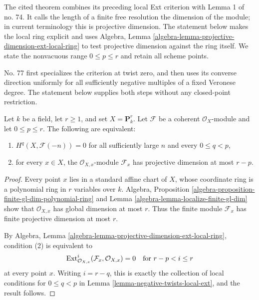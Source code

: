 \begin{lemma}
\label{lemma-negative-twists-projective-dimension}
\begin{reference}
\cite[Chapter III, \S 5, no. 74, Theorem 2,
p. 269]{FAC}
\cite[Chapter III, \S 5, no. 77, local corollary and
proof of Proposition 4(c), pp. 272--273]{FAC}
\end{reference}
\begin{history}
The cited theorem combines its preceding local Ext criterion with
Lemma 1 of no. 74. It calls the length of a finite free resolution the
dimension of the module; in current terminology this is projective
dimension. The statement below makes the local ring explicit and uses
Algebra, Lemma \ref{algebra-lemma-projective-dimension-ext-local-ring}
to test projective dimension against the ring itself. We state the
nonvacuous range $0\leq p\leq r$ and retain all scheme points.

No. 77 first specializes the criterion at twist zero, and then uses its
converse direction uniformly for all sufficiently negative multiples of a
fixed Veronese degree. The statement below supplies both steps without any
closed-point restriction.
\end{history}
Let $k$ be a field, let $r\geq1$, and set
$X=\mathbf{P}^r_k$. Let $\mathcal{F}$ be a coherent
$\mathcal{O}_X$-module and let $0\leq p\leq r$. The following are
equivalent:
\begin{enumerate}
\item $H^q(X,\mathcal{F}(-n))=0$ for all sufficiently large $n$ and
every $0\leq q<p$,
\item for every $x\in X$, the
$\mathcal{O}_{X,x}$-module $\mathcal{F}_x$ has projective dimension
at most $r-p$.
\end{enumerate}
\end{lemma}

\begin{proof}
Every point $x$ lies in a standard affine chart of $X$, whose coordinate
ring is a polynomial ring in $r$ variables over $k$. Algebra, Proposition
\ref{algebra-proposition-finite-gl-dim-polynomial-ring} and Lemma
\ref{algebra-lemma-localize-finite-gl-dim} show that
$\mathcal{O}_{X,x}$ has global dimension at most $r$. Thus the finite
module $\mathcal{F}_x$ has finite projective dimension at most $r$.

By Algebra, Lemma
\ref{algebra-lemma-projective-dimension-ext-local-ring}, condition (2)
is equivalent to
$$
\mathop{\mathrm{Ext}}\nolimits^i_{\mathcal{O}_{X,x}}
(\mathcal{F}_x,\mathcal{O}_{X,x})=0
\quad\text{for }r-p<i\leq r
$$
at every point $x$. Writing $i=r-q$, this is exactly the collection of
local conditions for $0\leq q<p$ in Lemma
\ref{lemma-negative-twists-local-ext}, and the result follows.
\end{proof}

